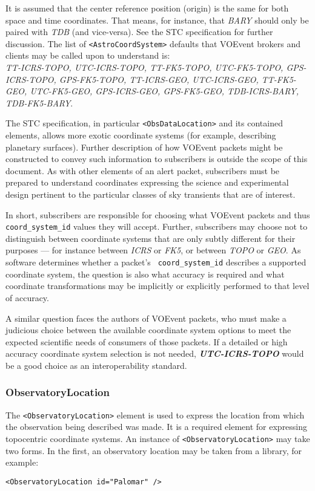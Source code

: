 \documentclass[11pt,a4paper]{ivoa}
\begin{document}
It is assumed that the center reference position (origin) is the same for both 
space and time coordinates. That means, for instance, that \emph{BARY} should 
only be paired with \emph{TDB} (and vice-versa). See the STC specification 
\citep{2007ivoa.spec.1030R} %
for further discussion. The list of \texttt{<AstroCoordSystem>} defaults that 
VOEvent brokers and clients may be called upon to understand is: \\
\emph{TT-ICRS-TOPO, UTC-ICRS-TOPO, TT-FK5-TOPO, UTC-FK5-TOPO, GPS-ICRS-TOPO,
GPS-FK5-TOPO, TT-ICRS-GEO, UTC-ICRS-GEO, TT-FK5-GEO, UTC-FK5-GEO, GPS-ICRS-GEO,
GPS-FK5-GEO, TDB-ICRS-BARY, TDB-FK5-BARY}.

The STC specification, in particular \texttt{<ObsDataLocation>} and its contained 
elements, allows more exotic coordinate systems (for example, describing 
planetary surfaces). Further description of how VOEvent packets might be 
constructed to convey such information to subscribers is outside the scope of 
this document. As with other elements of an alert packet, subscribers must be 
prepared to understand coordinates expressing the science and experimental 
design pertinent to the particular classes of sky transients that are of 
interest. 

In short, subscribers are responsible for choosing what VOEvent packets and thus
\texttt{coord\_system\_id} values they will accept. Further, subscribers may choose
not to distinguish between coordinate systems that are only subtly different for
their purposes --- for instance between \emph{ICRS} or \emph{FK5}, or between 
\emph{TOPO} or \emph{GEO}. As software determines whether a packet's \texttt{
coord\_system\_id} describes a supported coordinate system, the question is also
what accuracy is required and what coordinate transformations may be implicitly
or explicitly performed to that level of accuracy.

A similar question faces the authors of VOEvent packets, who must make a
judicious choice between the available coordinate system options to meet the
expected scientific needs of consumers of those packets. If a detailed or high
accuracy coordinate system selection is not needed, \emph{\bf UTC-ICRS-TOPO}
would be a good choice as an interoperability standard.

\subsubsection{ObservatoryLocation}
\label{sec:3.4.2}
The \texttt{<ObservatoryLocation>} element is used to express the location from 
which the observation being described was made. It is a required element for 
expressing topocentric coordinate systems. An instance of 
\texttt{<ObservatoryLocation>} may take two forms. In the first, an observatory location
may be taken from a library, for example: 
\begin{lstlisting}
<ObservatoryLocation id="Palomar" /> 
\end{lstlisting}
\end{document}
